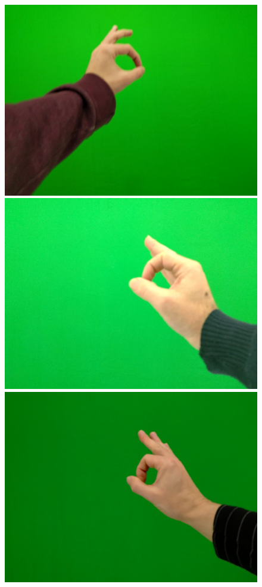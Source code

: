 \begin{figure}[htb]
   \centering
   \begin{minipage}[c]{0.19\linewidth}
      \includegraphics[width=0.95\linewidth]{figures/g2-1.jpg}
   \end{minipage} 
   \begin{minipage}[c]{0.19\linewidth}
      \includegraphics[width=0.95\linewidth]{figures/g2-3.jpg}
   \end{minipage}
   \begin{minipage}[c]{0.19\linewidth}
      \includegraphics[width=0.95\linewidth]{figures/g2-5.jpg}

\end{minipage}
\end{figure}
